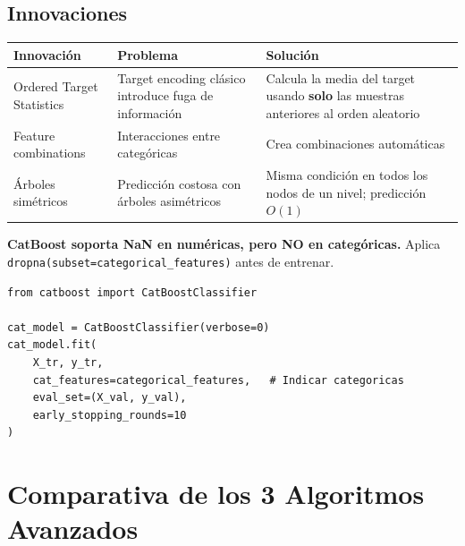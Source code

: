\documentclass[11pt, a4paper]{book}
\begin{document}
\subsection{Innovaciones}

\begin{resumen}
  \begin{tabular}{lp{5cm}p{5cm}}
    \toprule
    \textbf{Innovación} & \textbf{Problema} & \textbf{Solución}\\
    \midrule
    Ordered Target Statistics & Target encoding clásico introduce fuga de información &
      Calcula la media del target usando \textbf{solo} las muestras anteriores al orden aleatorio\\
    Feature combinations & Interacciones entre categóricas & Crea combinaciones automáticas\\
    Árboles simétricos & Predicción costosa con árboles asimétricos &
      Misma condición en todos los nodos de un nivel; predicción $O(1)$\\
    \bottomrule
  \end{tabular}
\end{resumen}

\begin{critico}
  \textbf{CatBoost soporta NaN en numéricas, pero NO en categóricas.}
  Aplica \texttt{dropna(subset=categorical\_features)} antes de entrenar.
\end{critico}

\begin{lstlisting}[caption={CatBoost con soporte nativo de categóricas}]
from catboost import CatBoostClassifier

cat_model = CatBoostClassifier(verbose=0)
cat_model.fit(
    X_tr, y_tr,
    cat_features=categorical_features,   # Indicar categoricas
    eval_set=(X_val, y_val),
    early_stopping_rounds=10
)
\end{lstlisting}

\section{Comparativa de los 3 Algoritmos Avanzados}
\end{document}
